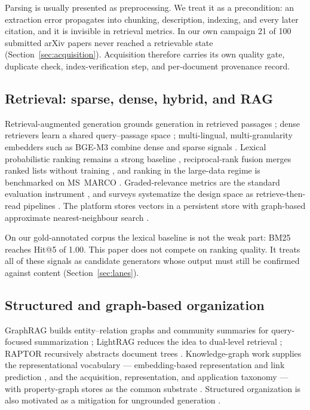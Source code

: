 Parsing is usually presented as preprocessing. We treat it as a precondition:
an extraction error propagates into chunking, description, indexing, and every
later citation, and it is invisible in retrieval metrics. In our own campaign
21 of 100 submitted arXiv papers never reached a retrievable state
(Section~\ref{sec:acquisition}). Acquisition therefore carries its own quality
gate, duplicate check, index-verification step, and per-document provenance
record.

\subsection{Retrieval: sparse, dense, hybrid, and RAG}
Retrieval-augmented generation grounds generation in retrieved passages
\citep{rag-lewis}; dense retrievers learn a shared query--passage space
\citep{dpr}; multi-lingual, multi-granularity embedders such as BGE-M3 combine
dense and sparse signals \citep{bge-m3}. Lexical probabilistic ranking remains
a strong baseline \citep{bm25}, reciprocal-rank fusion merges ranked lists
without training \citep{rrf-cormack}, and ranking in the large-data regime is
benchmarked on MS~MARCO \citep{craswell-msmarco-2021}. Graded-relevance metrics
are the standard evaluation instrument \citep{jarvelin-cumulated-gain-2002}, and
surveys systematize the design space as retrieve-then-read pipelines
\citep{gao-ragsurvey}. The platform stores vectors in a persistent store with
graph-based approximate nearest-neighbour search \citep{chroma,hnsw}.

On our gold-annotated corpus the lexical baseline is not the weak part: BM25
reaches Hit@5 of 1.00. This paper does not compete on ranking quality. It treats
all of these signals as candidate generators whose output must still be
confirmed against content (Section~\ref{sec:lanes}).

\subsection{Structured and graph-based organization}
GraphRAG builds entity--relation graphs and community summaries for
query-focused summarization \citep{graphrag}; LightRAG reduces the idea to
dual-level retrieval \citep{lightrag}; RAPTOR recursively abstracts document
trees \citep{raptor}. Knowledge-graph work supplies the representational
vocabulary --- embedding-based representation and link prediction
\citep{wang-kg-embedding-2017}, and the acquisition, representation, and
application taxonomy \citep{ji-kg-survey-2022} --- with property-graph stores as
the common substrate \citep{neo4j}. Structured organization is also motivated as
a mitigation for ungrounded generation \citep{siren}.

